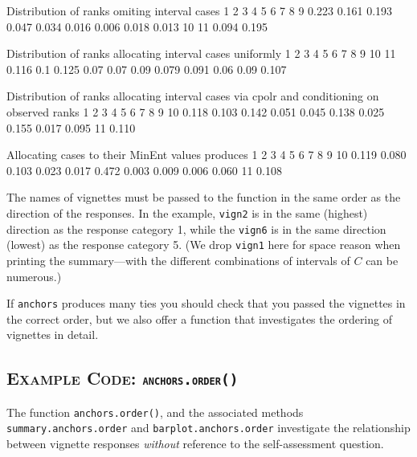 \documentclass{amsart}
\newcommand{\code}[1]{{\texttt{#1}}}
\newcommand{\ssubsection}[2]{%
  \subsection[#1]{\normalfont\scshape #1: {\tt #2}}}
\begin{document}
\begin{Schunk}
\begin{Soutput}
Distribution of ranks omiting interval cases
     1     2     3     4     5     6     7     8     9
 0.223 0.161 0.193 0.047 0.034 0.016 0.006 0.018 0.013
    10    11
 0.094 0.195

Distribution of ranks allocating interval cases uniformly
     1   2     3    4    5    6     7     8    9   10    11
 0.116 0.1 0.125 0.07 0.07 0.09 0.079 0.091 0.06 0.09 0.107

Distribution of ranks allocating interval cases via cpolr
and conditioning on observed ranks
    1     2     3     4     5     6     7     8     9    10 
0.118 0.103 0.142 0.051 0.045 0.138 0.025 0.155 0.017 0.095 
   11 
0.110 

Allocating cases to their MinEnt values produces
    1     2     3     4     5     6     7     8     9    10 
0.119 0.080 0.103 0.023 0.017 0.472 0.003 0.009 0.006 0.060 
   11 
0.108 
\end{Soutput}
\end{Schunk}
The names of vignettes must be passed to the function in the same
order as the direction of the responses.  In the example,
\code{vign2} is in the same (highest) direction as the response
category 1, while the \code{vign6} is in the same direction (lowest)
as the response category 5.  (We drop \code{vign1} here for space
reason when printing the summary---with the different combinations of
intervals of $C$ can be numerous.)

If \texttt{anchors} produces many ties you should check that you
passed the vignettes in the correct order, but we also offer a
function that investigates the ordering of vignettes in detail.

\ssubsection{Example Code}{anchors.order()}

The function \code{anchors.order()}, and the associated methods
\code{summary.anchors.order} and \code{barplot.anchors.order}
investigate the relationship between vignette responses {\em without}
reference to the self-assessment question.
\end{document}
